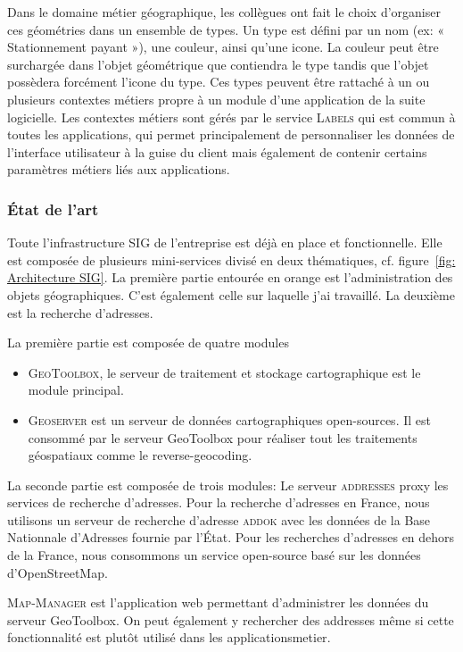 \documentclass{rapportUHA40}
\begin{document}
Dans le domaine métier géographique, les collègues ont fait le choix
d'organiser ces géométries dans un ensemble de types. Un type est défini par un
nom (ex: « Stationnement payant »), une couleur, ainsi qu'une icone. La couleur
peut être surchargée dans l'objet géométrique que contiendra le type tandis que
l'objet possèdera forcément l'icone du type. Ces types peuvent être rattaché à
un ou plusieurs contextes métiers propre à un module d'une application de la
suite logicielle. Les contextes métiers sont gérés par le service
\textsc{Labels} qui est commun à toutes les applications, qui permet
principalement de personnaliser les données de l'interface utilisateur à la
guise du client mais également de contenir certains paramètres métiers liés aux
applications.

\subsubsection{État de l'art}
Toute l'infrastructure SIG de l'entreprise est déjà en place et fonctionnelle.
Elle est composée de plusieurs mini-services divisé en deux thématiques, cf.
figure~\ref{fig: Architecture SIG}. La première partie entourée en orange est
l'administration des objets géographiques. C'est également celle sur laquelle
j'ai travaillé. La deuxième est la recherche d'adresses.

La première partie est composée de quatre modules
\begin{itemize}
  \item \textsc{GeoToolbox}, le serveur de
        traitement et stockage cartographique est le module principal.
  \item \textsc{Geoserver} est un serveur de données cartographiques open-sources.
        Il est consommé par le serveur GeoToolbox pour réaliser tout les traitements
        géospatiaux comme le \gls{reverse-geocoding}.
\end{itemize}

La seconde partie est composée de trois modules: Le serveur \textsc{addresses}
\gls{proxy} les services de recherche d'adresses. Pour la recherche d'adresses
en France, nous utilisons un serveur de recherche d'adresse \textsc{addok} avec
les données de la Base Nationnale d'Adresses fournie par l'État. Pour les
recherches d'adresses en dehors de la France, nous consommons un service
open-source basé sur les données d'OpenStreetMap.

\textsc{Map-Manager} est l'application web permettant d'administrer les données
du serveur GeoToolbox. On peut également y rechercher des addresses même si
cette fonctionnalité est plutôt utilisé dans les \gls{applicationsmetier}.
\end{document}
